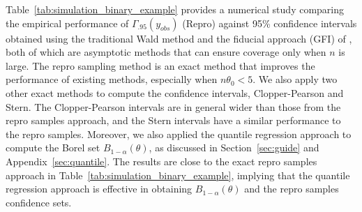 \documentclass[12pt]{article}
\theoremstyle{shortspace}
\begin{document}
Table~\ref{tab:simulation_binary_example}  provides a numerical study comparing the empirical performance of $\Gamma_{.95}(y_{obs})$ (Repro) against 95\% confidence intervals obtained using the traditional Wald method and the fiducial approach (GFI) of \cite{Hannig2009}, both of which are asymptotic methods that can ensure coverage only when $n$ is large. The repro sampling method is an exact method that improves the performance of existing methods, especially when $n \theta_0 < 5$.  We also apply two other exact methods to compute the confidence intervals, Clopper-Pearson and Stern. The Clopper-Pearson intervals are in general wider than those from the repro samples approach, and the Stern intervals have a similar performance to the repro samples. {Moreover, we also applied the quantile regression approach to compute the Borel set $B_{1-\alpha}(\theta)$, as discussed in Section~\ref{sec:guide} and Appendix~\ref{sec:quantile}. The results are close to the exact repro samples approach in Table~\ref{tab:simulation_binary_example}, implying that the quantile regression approach is effective in obtaining $B_{1-\alpha}(\theta)$ and the repro samples confidence sets. }


\begin{table}[!t]
   \centering 
{}
 \captionsetup{font= small}
    \caption{Comparison of $95\%$ confidence intervals by the repro, Wald and GFI methods in Binomial$(n, \theta_0)$ data; repetitions $= 1000$; standard errors (sd's) are enclosed in brackets.}
    \label{tab:simulation_binary_example}
\end{table}
\end{document}
